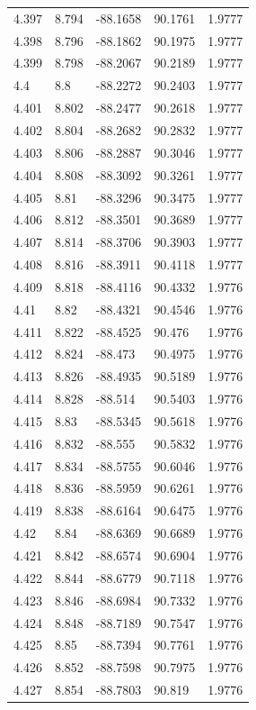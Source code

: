 \begin{tabular}{lllll}
4.397 & 8.794 & -88.1658 & 90.1761 & 1.9777 \\
4.398 & 8.796 & -88.1862 & 90.1975 & 1.9777 \\
4.399 & 8.798 & -88.2067 & 90.2189 & 1.9777 \\
4.4 & 8.8 & -88.2272 & 90.2403 & 1.9777 \\
4.401 & 8.802 & -88.2477 & 90.2618 & 1.9777 \\
4.402 & 8.804 & -88.2682 & 90.2832 & 1.9777 \\
4.403 & 8.806 & -88.2887 & 90.3046 & 1.9777 \\
4.404 & 8.808 & -88.3092 & 90.3261 & 1.9777 \\
4.405 & 8.81 & -88.3296 & 90.3475 & 1.9777 \\
4.406 & 8.812 & -88.3501 & 90.3689 & 1.9777 \\
4.407 & 8.814 & -88.3706 & 90.3903 & 1.9777 \\
4.408 & 8.816 & -88.3911 & 90.4118 & 1.9777 \\
4.409 & 8.818 & -88.4116 & 90.4332 & 1.9776 \\
4.41 & 8.82 & -88.4321 & 90.4546 & 1.9776 \\
4.411 & 8.822 & -88.4525 & 90.476 & 1.9776 \\
4.412 & 8.824 & -88.473 & 90.4975 & 1.9776 \\
4.413 & 8.826 & -88.4935 & 90.5189 & 1.9776 \\
4.414 & 8.828 & -88.514 & 90.5403 & 1.9776 \\
4.415 & 8.83 & -88.5345 & 90.5618 & 1.9776 \\
4.416 & 8.832 & -88.555 & 90.5832 & 1.9776 \\
4.417 & 8.834 & -88.5755 & 90.6046 & 1.9776 \\
4.418 & 8.836 & -88.5959 & 90.6261 & 1.9776 \\
4.419 & 8.838 & -88.6164 & 90.6475 & 1.9776 \\
4.42 & 8.84 & -88.6369 & 90.6689 & 1.9776 \\
4.421 & 8.842 & -88.6574 & 90.6904 & 1.9776 \\
4.422 & 8.844 & -88.6779 & 90.7118 & 1.9776 \\
4.423 & 8.846 & -88.6984 & 90.7332 & 1.9776 \\
4.424 & 8.848 & -88.7189 & 90.7547 & 1.9776 \\
4.425 & 8.85 & -88.7394 & 90.7761 & 1.9776 \\
4.426 & 8.852 & -88.7598 & 90.7975 & 1.9776 \\
4.427 & 8.854 & -88.7803 & 90.819 & 1.9776 \\

\end{tabular}
